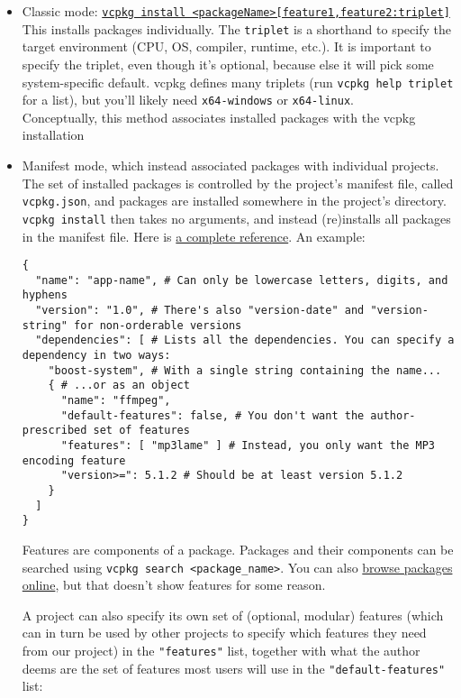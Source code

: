 \documentclass[8pt, table, xcdraw]{article}%
\begin{document}
\begin{itemize}
    \item Classic mode: \href{https://vcpkg.io/en/docs/commands/install.html}{\lstinline{vcpkg install <packageName>[feature1,feature2:triplet]}}\\
    This installs packages individually. The \lstinline{triplet} is a shorthand to specify the target environment (CPU, OS, compiler, runtime, etc.). It is important to specify the triplet, even though it's optional, because else it will pick some system-specific default. vcpkg defines many triplets (run \lstinline{vcpkg help triplet} for a list), but you'll likely need \lstinline{x64-windows} or \lstinline{x64-linux}.\\
    Conceptually, this method associates installed packages with the vcpkg installation
    \item Manifest mode, which instead associated packages with individual projects. The set of installed packages is controlled by the project's manifest file, called \lstinline{vcpkg.json}, and packages are installed somewhere in the project's directory. \lstinline{vcpkg install} then takes no arguments, and instead (re)installs all packages in the manifest file. Here is \href{https://learn.microsoft.com/en-us/vcpkg/reference/vcpkg-json}{a complete reference}. An example:
    
    \begin{lstlisting}
{
  "name": "app-name", # Can only be lowercase letters, digits, and hyphens
  "version": "1.0", # There's also "version-date" and "version-string" for non-orderable versions
  "dependencies": [ # Lists all the dependencies. You can specify a dependency in two ways:
    "boost-system", # With a single string containing the name...
    { # ...or as an object
      "name": "ffmpeg",
      "default-features": false, # You don't want the author-prescribed set of features
      "features": [ "mp3lame" ] # Instead, you only want the MP3 encoding feature
      "version>=": 5.1.2 # Should be at least version 5.1.2
    }
  ]
}
    \end{lstlisting}
    
    Features are components of a package. Packages and their components can be searched using \lstinline{vcpkg search <package_name>}. You can also \href{https://vcpkg.io/en/packages.html}{browse packages online}, but that doesn't show features for some reason.
    
    A project can also specify its own set of (optional, modular) features (which can in turn be used by other projects to specify which features they need from our project) in the \lstinline{"features"} list, together with what the author deems are the set of features most users will use in the \lstinline{"default-features"} list:
    

\end{itemize}
\end{document}
